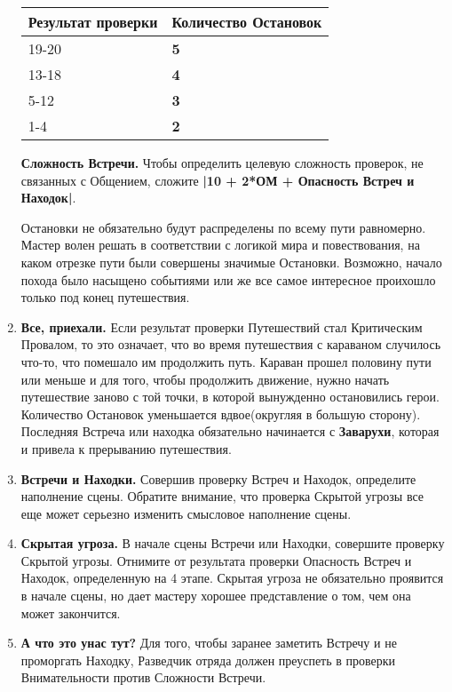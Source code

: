 \begin{enumerate}
\begin{center}
\begin{tabular}{ |p{2.7cm}|p{12cm}| }
\hline
\textbf{Результат проверки} & \textbf{Количество Остановок}
\\ \hline
19-20 & \textbf{5}
\\ \hline
13-18 & \textbf{4}
\\ \hline
5-12 & \textbf{3}
\\ \hline
1-4 & \textbf{2}
\\ \hline
\end{tabular}
\end{center}
\textbf{Сложность Встречи.} Чтобы определить целевую сложность проверок, не связанных с Общением, сложите \textbf{|10 + 2*ОМ + Опасность Встреч и Находок|}.
\begin{tcolorbox}
Остановки не обязательно будут распределены по всему пути равномерно. Мастер волен решать в соответствии с логикой мира и повествования, на каком отрезке пути были совершены значимые Остановки. Возможно, начало похода было насыщено событиями или же все самое интересное проихошло только под конец путешествия.
\end{tcolorbox}
\item \textbf{Все, приехали.} Если результат проверки Путешествий стал Критическим Провалом, то это означает, что во время путешествия с караваном случилось что-то, что помешало им продолжить путь. Караван прошел половину пути или меньше и для того, чтобы продолжить движение, нужно начать путешествие заново с той точки, в которой вынужденно остановились герои.
\newline Количество Остановок уменьшается вдвое(округляя в большую сторону). Последняя Встреча или находка обязательно начинается с \textbf{Заварухи}, которая и привела к прерыванию путешествия.
\item \textbf{Встречи и Находки.} Совершив проверку Встреч и Находок, определите наполнение сцены. Обратите внимание, что проверка Скрытой угрозы все еще может серьезно изменить смысловое наполнение сцены.
\item \textbf{Скрытая угроза.} В начале сцены Встречи или Находки, совершите проверку Скрытой угрозы. Отнимите от результата проверки Опасность Встреч и Находок, определенную на 4 этапе. Скрытая угроза не обязательно проявится в начале сцены, но дает мастеру хорошее представление о том, чем она может закончится.
\item \textbf{А что это унас тут?} Для того, чтобы заранее заметить Встречу и не проморгать Находку, Разведчик отряда должен преуспеть в проверки Внимательности против Сложности Встречи.

\end{enumerate}
